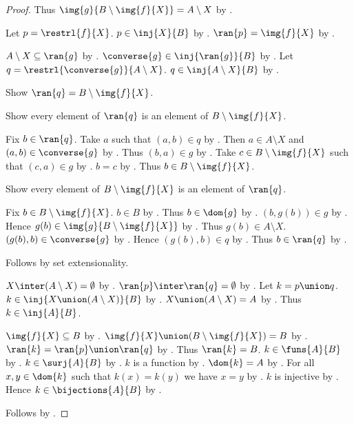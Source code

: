 \begin{proof}
    Thus $\img{g}{B\setminus\img{f}{X}} = A\setminus X$ by .

    Let $p=\restrl{f}{X}$.
    $p\in\inj{X}{B}$ by .
    $\ran{p}=\img{f}{X}$ by .

    $A\setminus X\subseteq\ran{g}$
        by .
    $\converse{g}\in\inj{\ran{g}}{B}$
        by .
    Let $q=\restrl{\converse{g}}{A\setminus X}$.
    $q\in\inj{A\setminus X}{B}$ by .

    Show $\ran{q}=B\setminus\img{f}{X}$.
    \begin{subproof}
        Show every element of $\ran{q}$ is an element of
            $B\setminus\img{f}{X}$.
        \begin{subproof}
            Fix $b\in\ran{q}$.
            Take $a$ such that $(a,b)\in q$ by .
            Then $a\in A\setminus X$ and $(a,b)\in\converse{g}$
                by .
            Thus $(b,a)\in g$ by .
            Take $c\in B\setminus\img{f}{X}$ such that $(c,a)\in g$
                by .
            $b=c$ by .
            Thus $b\in B\setminus\img{f}{X}$.
        \end{subproof}
        Show every element of $B\setminus\img{f}{X}$ is an element of
            $\ran{q}$.
        \begin{subproof}
            Fix $b\in B\setminus\img{f}{X}$.
            $b\in B$ by .
            Thus $b\in\dom{g}$ by .
            $(b,g(b))\in g$ by .
            Hence $g(b)\in\img{g}{B\setminus\img{f}{X}}$
                by .
            Thus $g(b)\in A\setminus X$.
            $(g(b),b)\in\converse{g}$ by .
            Hence $(g(b),b)\in q$ by .
            Thus $b\in\ran{q}$ by .
        \end{subproof}
        Follows by set extensionality.
    \end{subproof}

    $X\inter(A\setminus X)=\emptyset$ by .
    $\ran{p}\inter\ran{q}=\emptyset$
        by .
    Let $k=p\union q$.
    $k\in\inj{X\union(A\setminus X)}{B}$
        by .
    $X\union(A\setminus X)=A$ by .
    Thus $k\in\inj{A}{B}$.

    $\img{f}{X}\subseteq B$
        by .
    $\img{f}{X}\union(B\setminus\img{f}{X})=B$
        by .
    $\ran{k}=\ran{p}\union\ran{q}$ by .
    Thus $\ran{k}=B$.
    $k\in\funs{A}{B}$ by .
    $k\in\surj{A}{B}$ by .
    $k$ is a function by .
    $\dom{k}=A$ by .
    For all $x,y\in\dom{k}$ such that $k(x)=k(y)$ we have $x=y$
        by .
    $k$ is injective by .
    Hence $k\in\bijections{A}{B}$ by .

    Follows by .
\end{proof}
